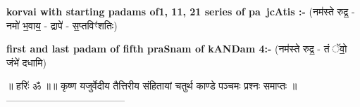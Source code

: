 \documentclass[17pt]{extarticle}
\begin{document}
        \textbf{korvai with starting padams of1, 11, 21 series of pa~jcAtis :-} \newline
        (नम॑स्ते रुद्र॒ - नमो॑ भ॒वाय॒ - द्रापे॑ - स॒प्तविꣳ॑शतिः) \newline

        \textbf{first and last padam of fifth praSnam of kANDam 4:-} \newline
        (नम॑स्ते रुद्र॒ - तं ॅवो॒ जंभे॑ दधामि) \newline 

        
        ॥ हरिः॑ ॐ ॥॥ कृष्ण यजुर्वेदीय तैत्तिरीय संहितायां चतुर्थ काण्डे पञ्चमः प्रश्नः समाप्तः ॥
------------------------------------ \newline
        \pagebreak
                \pagebreak
        
\end{document}
